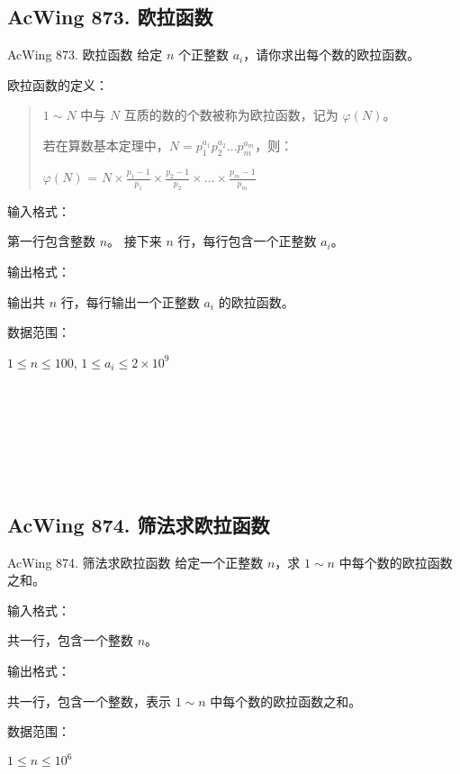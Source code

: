 \subsection{AcWing 873. 欧拉函数}
\begin{titledbox}{AcWing 873. 欧拉函数}
    给定 $n$ 个正整数 $a_i$，请你求出每个数的欧拉函数。

    欧拉函数的定义：

    \begin{quote}
        $1 \sim N$ 中与 $N$ 互质的数的个数被称为欧拉函数，记为 $\varphi(N)$。

        若在算数基本定理中，$N = p_1^{a_1}p_2^{a_2}\dots p_m^{a_m}$，则：

        $\varphi (N)$ = $N \times \frac{p_1-1}{p_1} \times \frac{p_2-1}{p_2} \times \dots \times \frac{p_m-1}{p_m}$
    \end{quote}

    输入格式：

    第一行包含整数 $n$。 接下来 $n$ 行，每行包含一个正整数 $a_i$。

    输出格式：

    输出共 $n$ 行，每行输出一个正整数 $a_i$ 的欧拉函数。

    数据范围：

    $1 \le n \le 100$, $1 \le a_i \le 2 \times 10^9$

    \begin{inputblock}
         \\
         \\
         \\
    \end{inputblock}
    \begin{outputblock}
         \\
         \\
    \end{outputblock}
\end{titledbox}

\subsection{AcWing 874. 筛法求欧拉函数}
\begin{titledbox}{AcWing 874. 筛法求欧拉函数}
    给定一个正整数 $n$，求 $1 \sim n$ 中每个数的欧拉函数之和。

    输入格式：

    共一行，包含一个整数 $n$。

    输出格式：

    共一行，包含一个整数，表示 $1 \sim n$ 中每个数的欧拉函数之和。

    数据范围：

    $1 \le n \le 10^6$

    \begin{inputblock}
    \end{inputblock}
    \begin{outputblock}
    \end{outputblock}
\end{titledbox}


